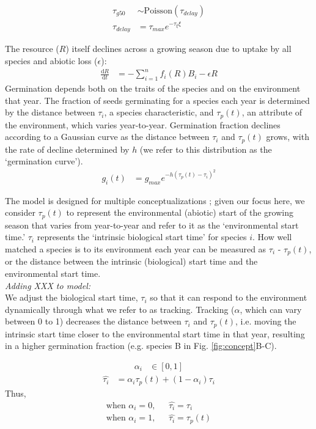 \documentclass[11pt,letter]{article}
\begin{document}
\begin{align}
\tau_{g50} & \sim \mathrm{Poisson}(\tau_{delay})\\
\tau_{delay} & = \tau_{max}e^{-\tau_{\xi}\xi}
\end{align}

The resource ($R$) itself declines across a growing season due to uptake by all species and abiotic loss ($\epsilon$):
\begin{align}
\frac{\mathrm{d}R}{\mathrm{d}t} & = - \sum_{i=1}^{n}f_{i}(R)B_{i} -\epsilon R
\end{align}
Germination depends both on the traits of the species and on the environment that year. The fraction of seeds germinating for a species each year is determined by the distance between $\tau_i$, a species characteristic, and $\tau_p(t)$, an attribute of the environment, which varies year-to-year. Germination fraction declines according to a Gaussian curve as the distance between $\tau_i$ and $\tau_p(t)$ grows, with the rate of decline determined by $h$ (we refer to this distribution as the `germination curve').  
\begin{align}
g_{i}(t) & = g_{max}e^{-h(\tau_{p}(t)-\tau_{i})^2} 
\end{align}

The model is designed for multiple conceptualizations \citep{Chesson:2004eo}; given our focus here, we consider $\tau_p(t)$ to represent the environmental (abiotic) start of the growing season that varies from year-to-year and refer to it as the `environmental start time.'  $\tau_i$ represents the `intrinsic biological start time' for species $i$. How well matched a species is to its environment each year can be measured as $\tau_i$ - $\tau_p(t)$, or the distance between the intrinsic (biological) start time and the environmental start time. \\

\noindent \emph{Adding XXX to model:}\\
We adjust the biological start time, $\tau_i$ so that it can respond to the environment dynamically through what we refer to as tracking. Tracking ($\alpha$, which can vary between 0 to 1) decreases the distance between $\tau_i$ and $\tau_p(t)$, i.e. moving the intrinsic start time closer to the environmental start time in that year, resulting in a higher germination fraction (e.g. species B in Fig. \ref{fig:concept}B-C).

\begin{align*}
\alpha_{i} & \in [0, 1]  
\end{align*}
\begin{align}
\hat{\tau_{i}} & = \alpha_{i} \tau_{p}(t) + (1-\alpha_{i})\tau_{i}
\end{align}
\noindent Thus, 
\begin{align*}
\text{when } \alpha_{i} = 0, \text{ }& \hat{\tau_{i}}=\tau_{i}\\
\text{when }  \alpha_{i} = 1, \text{ }& \hat{\tau_{i}}=\tau_{p}(t)
\end{align*}
\end{document}
